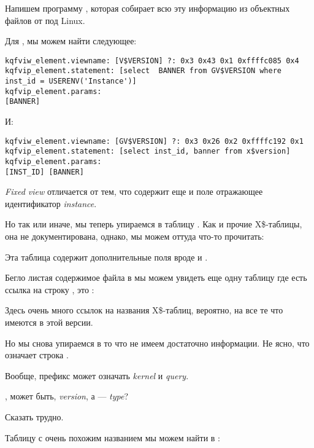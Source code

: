 Напишем программу \oracletables, которая собирает всю эту информацию из объектных файлов от \oracle под Linux.

Для , мы можем найти следующее:

\begin{lstlisting}[caption=Результат работы \OracleTablesName]
kqfviw_element.viewname: [V$VERSION] ?: 0x3 0x43 0x1 0xffffc085 0x4
kqfvip_element.statement: [select  BANNER from GV$VERSION where inst_id = USERENV('Instance')]
kqfvip_element.params:
[BANNER] 
\end{lstlisting}

И:

\begin{lstlisting}[caption=Результат работы \OracleTablesName]
kqfviw_element.viewname: [GV$VERSION] ?: 0x3 0x26 0x2 0xffffc192 0x1
kqfvip_element.statement: [select inst_id, banner from x$version]
kqfvip_element.params:
[INST_ID] [BANNER] 
\end{lstlisting}

\emph{Fixed view}  отличается от  тем, что содержит еще и поле отражающее идентификатор \emph{instance}.

Но так или иначе, мы теперь упираемся в таблицу . Как и прочие X\$-таблицы, она не документирована, однако, мы можем оттуда что-то прочитать:



Эта таблица содержит дополнительные поля вроде  и .

Бегло листая содержимое файла  в \IDA мы можем увидеть еще одну таблицу где есть ссылка на строку , это :



Здесь очень много ссылок на названия X\$-таблиц, вероятно, на все те что имеются в \oracle этой версии.

Но мы снова упираемся в то что не имеем достаточно информации.
Не ясно, что означает строка .
 
Вообще, префикс  может означать \emph{kernel} и \emph{query}.
 
, может быть, \emph{version}, а  --- \emph{type}?
 
Сказать трудно.

Таблицу с очень похожим названием мы можем найти в :

